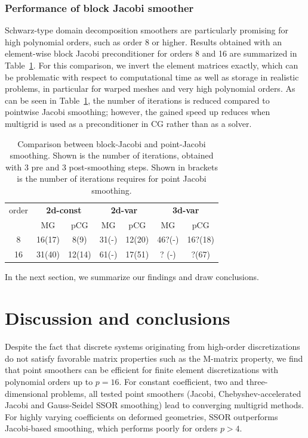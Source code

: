\documentclass[smallcondensed,final]{svjour3}     %
\begin{document}
\subsubsection{Performance of block Jacobi smoother}\label{subsec:num_block}
Schwarz-type domain decomposition smoothers are particularly promising
for high polynomial orders, such as order 8 or higher. Results
obtained with an element-wise block Jacobi preconditioner for orders 8
and 16 are summarized in Table~\ref{tab:block-jac}. For this
comparison, we invert the element matrices exactly, which can be
problematic with respect to computational time as well as storage in
realistic problems, in particular for warped meshes and very high
polynomial orders. As can be seen in Table~\ref{tab:block-jac}, the
number of iterations is reduced compared to pointwise Jacobi
smoothing; however, the gained speed up reduces when multigrid is
used as a preconditioner in CG rather than as a solver.
\begin{table}\centering
	\caption{\label{tab:block-jac} Comparison between block-Jacobi
          and point-Jacobi smoothing. Shown is the number of
          iterations, obtained with 3
          pre and 3 post-smoothing steps. Shown in brackets is the
          number of iterations requires for point Jacobi smoothing.}
\begin{tabular}{|c|c|c|c|c|c|c|}
	\hline
	order & \multicolumn{2}{c|}{\bf 2d-const} &
        \multicolumn{2}{c|}{\bf 2d-var} & \multicolumn{2}{c|}{\bf 3d-var} \\
	\cline{2-7}
	 & MG & pCG  & MG & pCG & MG & pCG \\
	\hline
	8  & 16(17) & 8(9)   &  31(-)  & 12(20) & 46?(-) & 16?(18) \\
	16 & 31(40) & 12(14) &  61(-)  & 17(51) &  ? (-)  &  ?(67)  \\
	\hline
\end{tabular}
\end{table}
In the next section, we summarize our findings and draw conclusions.

\section{Discussion and conclusions}
\label{sec:discuss}

Despite the fact that discrete systems originating from high-order
discretizations do not satisfy favorable matrix properties such as the
M-matrix property, we find that point smoothers can be efficient for
finite element discretizations with polynomial orders up to $p=16$.
For constant coefficient, two and three-dimensional problems, all
tested point smoothers (Jacobi, Chebyshev-accelerated Jacobi and
Gauss-Seidel SSOR smoothing) lead to converging multigrid methods. For
highly varying coefficients on deformed geometries, SSOR outperforms
Jacobi-based smoothing, which performs poorly for orders $p>4$.
\end{document}
